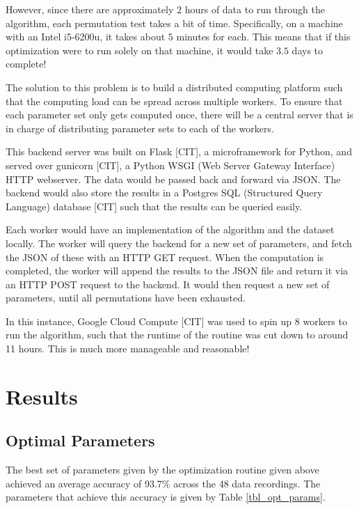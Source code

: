         However, since there are approximately $2$ hours of data to run through the algorithm, each permutation test takes a bit of time. Specifically, on a machine with an Intel i5-6200u, it takes about $5$ minutes for each. This means that if this optimization were to run solely on that machine, it would take $3.5$ days to complete! 

        The solution to this problem is to build a distributed computing platform such that the computing load can be spread across multiple workers. To ensure that each parameter set only gets computed once, there will be a central server that is in charge of distributing parameter sets to each of the workers. 

        This backend server was built on Flask [CIT], a microframework for Python, and served over gunicorn [CIT], a Python WSGI (Web Server Gateway Interface) HTTP webserver. The data would be passed back and forward via JSON. The backend would also store the results in a Postgres SQL (Structured Query Language) database [CIT] such that the results can be queried easily.

        Each worker would have an implementation of the algorithm and the dataset locally. The worker will query the backend for a new set of parameters, and fetch the JSON of these with an HTTP GET request. When the computation is completed, the worker will append the results to the JSON file and return it via an HTTP POST request to the backend. It would then request a new set of parameters, until all permutations have been exhausted.

        In this instance, Google Cloud Compute [CIT] was used to spin up 8 workers to run the algorithm, such that the runtime of the routine was cut down to around 11 hours. This is much more manageable and reasonable!

    \chapter{Results}

        \section{Optimal Parameters}

            The best set of parameters given by the optimization routine given above achieved an average accuracy of 93.7\% across the 48 data recordings. The parameters that achieve this accuracy is given by Table \ref{tbl_opt_params}.

